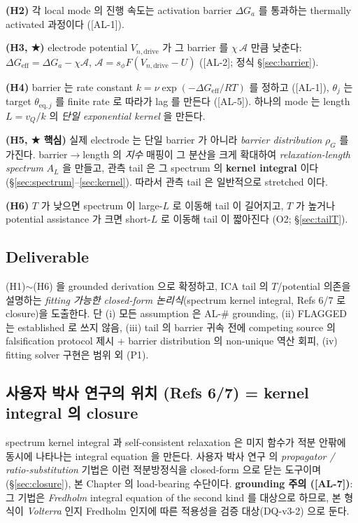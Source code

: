 \documentclass[11pt,a4paper]{article}
\newcommand{\eff}{\mathrm{eff}}
\newcommand{\eq}{\mathrm{eq}}
\newcommand{\dimedrive}{\mathrm{drive}}
\newcommand{\AL}[1]{\textsf{[AL-#1]}}
\begin{document}
\textbf{(H2)} 각 local mode 의 진행 속도는 activation barrier $\Delta G_{a}$ 를 통과하는
thermally activated 과정이다 (\AL{1}).

\textbf{(H3, ★)} electrode potential $V_{n,\dimedrive}$ 가 그 barrier 를 $\chi\,\mathcal A$
만큼 낮춘다: $\Delta G_\eff = \Delta G_a - \chi\mathcal A$, $\mathcal A=s_\phi F(V_{n,\dimedrive}-U)$
(\AL{2}; 정식 \S\ref{sec:barrier}).

\textbf{(H4)} barrier 는 rate constant $k=\nu\exp(-\Delta G_\eff/RT)$ 를 정하고 (\AL{1}),
$\theta_j$ 는 target $\theta_{\eq,j}$ 를 finite rate 로 따라가 lag 를 만든다 (\AL{5}).
하나의 mode 는 length $L=v_Q/k$ 의 \emph{단일 exponential kernel} 을 만든다.

\textbf{(H5, ★ 핵심)} 실제 electrode 는 단일 barrier 가 아니라 \emph{barrier
distribution} $\rho_G$ 를 가진다. barrier$\to$length 의 \emph{지수} 매핑이 그 분산을
크게 확대하여 \emph{relaxation-length spectrum} $A_L$ 을 만들고, 관측 tail 은 그 spectrum
의 \textbf{kernel integral} 이다 (\S\ref{sec:spectrum}--\ref{sec:kernel}). 따라서 관측
tail 은 일반적으로 stretched 이다.

\textbf{(H6)} $T$ 가 낮으면 spectrum 이 large-$L$ 로 이동해 tail 이 길어지고, $T$ 가
높거나 potential assistance 가 크면 short-$L$ 로 이동해 tail 이 짧아진다 (O2; \S\ref{sec:tailT}).

\subsection{Deliverable}\label{sec:deliverable}
(H1)$\sim$(H6) 을 grounded derivation 으로 확정하고, ICA tail 의 $T$/potential 의존을
설명하는 \emph{fitting 가능한 closed-form 논리식}(spectrum kernel integral, Refs 6/7 로
closure)을 도출한다. 단 (i) 모든 assumption 은 AL-\# grounding, (ii) FLAGGED 는 established
로 쓰지 않음, (iii) tail 의 barrier 귀속 전에 competing source 의 falsification protocol
제시 + barrier distribution 의 non-unique 역산 회피, (iv) fitting solver 구현은 범위 외 (P1).

\subsection{사용자 박사 연구의 위치 (Refs 6/7) = kernel integral 의 closure}\label{sec:phd}
spectrum kernel integral 과 self-consistent relaxation 은 미지 함수가 적분 안팎에 동시에
나타나는 integral equation 을 만든다. 사용자 박사 연구 \cite{lee2011,son2013} 의
\emph{propagator / ratio-substitution} 기법은 이런 적분방정식을 closed-form 으로 닫는
도구이며 (\S\ref{sec:closure}), 본 Chapter 의 load-bearing 수단이다. \textbf{grounding 주의
(\AL{7})}: 그 기법은 \emph{Fredholm} integral equation of the second kind 를 대상으로
하므로, 본 형식이 \emph{Volterra} 인지 Fredholm 인지에 따른 적용성을 검증 대상(DQ-v3-2)
으로 둔다.
\end{document}
